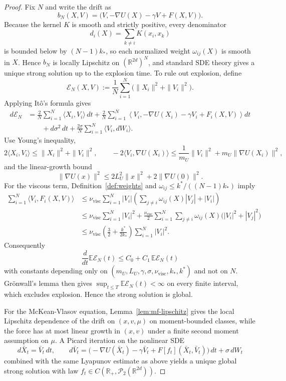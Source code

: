 \documentclass[11pt]{article}
\theoremstyle{definition}
\theoremstyle{remark}
\newcommand{\R}{\mathbb{R}}
\newcommand{\E}{\mathbb{E}}
\newcommand{\mcP}{\mathcal{P}}
\begin{document}
\begin{proof}
Fix $N$ and write the drift as
\[
b_N(X,V)=\bigl(V,-\nabla U(X)-\gamma V+F(X,V)\bigr).
\]
Because the kernel $K$ is smooth and strictly positive, every denominator
\[
d_i(X)=\sum_{k\neq i}K(x_i,x_k)
\]
is bounded below by \((N-1)k_*\), so each normalized weight \(\omega_{ij}(X)\)
is smooth in \(X\). Hence \(b_N\) is locally Lipschitz on \((\R^{2d})^N\), and
standard SDE theory gives a unique strong solution up to the explosion time. To
rule out explosion, define
\[
\mathcal E_N(X,V):=\frac1N\sum_{i=1}^N \bigl(\|X_i\|^2+\|V_i\|^2\bigr).
\]
Applying It\^o's formula gives
\begin{align*}
d\mathcal E_N
&=
\frac{2}{N}\sum_{i=1}^N \langle X_i,V_i\rangle\,dt
+\frac{2}{N}\sum_{i=1}^N \left\langle V_i,-\nabla U(X_i)-\gamma V_i+F_i(X,V)\right\rangle dt\\
&\qquad
+d\sigma^2\,dt+\frac{2\sigma}{N}\sum_{i=1}^N \langle V_i,dW_i\rangle.
\end{align*}
Use Young's inequality,
\[
2\langle X_i,V_i\rangle \leq \|X_i\|^2+\|V_i\|^2,
\qquad
-2\langle V_i,\nabla U(X_i)\rangle
\leq
\frac{1}{m_U}\|V_i\|^2+m_U\|\nabla U(X_i)\|^2,
\]
and the linear-growth bound
\[
\|\nabla U(x)\|^2
\leq
2L_U^2\|x\|^2+2\|\nabla U(0)\|^2.
\]
For the viscous term, Definition~\ref{def:weights} and
$\omega_{ij}\leq k^*/((N-1)k_*)$ imply
\begin{align*}
\sum_{i=1}^N \langle V_i,F_i(X,V)\rangle
&\leq
\nu_{\mathrm{visc}}\sum_{i=1}^N |V_i|
\left(\sum_{j\neq i}\omega_{ij}(X)|V_j|+|V_i|\right)\\
&\leq
\nu_{\mathrm{visc}}\sum_{i=1}^N |V_i|^2
+\frac{\nu_{\mathrm{visc}}}{2}\sum_{i=1}^N\sum_{j\neq i}\omega_{ij}(X)
\bigl(|V_i|^2+|V_j|^2\bigr)\\
&\leq
\nu_{\mathrm{visc}}\left(
\frac32+\frac{k^*}{2k_*}
\right)\sum_{i=1}^N |V_i|^2.
\end{align*}
Consequently
\[
\frac{d}{dt}\E\mathcal E_N(t)
\leq
C_0+C_1\,\E\mathcal E_N(t)
\]
with constants depending only on
$(m_U,L_U,\gamma,\sigma,\nu_{\mathrm{visc}},k_*,k^*)$ and not on $N$. Gr\"onwall's
lemma then gives $\sup_{t\leq T}\E\mathcal E_N(t)<\infty$ on every finite
interval, which excludes explosion. Hence the strong solution is global.

For the McKean-Vlasov equation, Lemma~\ref{lem:mf-lipschitz} gives the local
Lipschitz dependence of the drift on \((x,v,\mu)\) on moment-bounded classes,
while the force has at most linear growth in \((x,v)\) under a finite second
moment assumption on \(\mu\). A Picard iteration on the nonlinear SDE
\[
d\bar X_t=\bar V_t\,dt,
\qquad
d\bar V_t=
\bigl(-\nabla U(\bar X_t)-\gamma \bar V_t+F[f_t](\bar X_t,\bar V_t)\bigr)\,dt
+\sigma\,dW_t
\]
combined with the same Lyapunov estimate as above yields a unique global strong
solution with law \(f_t\in C(\R_+,\mcP_2(\R^{2d}))\).
\end{proof}
\end{document}
